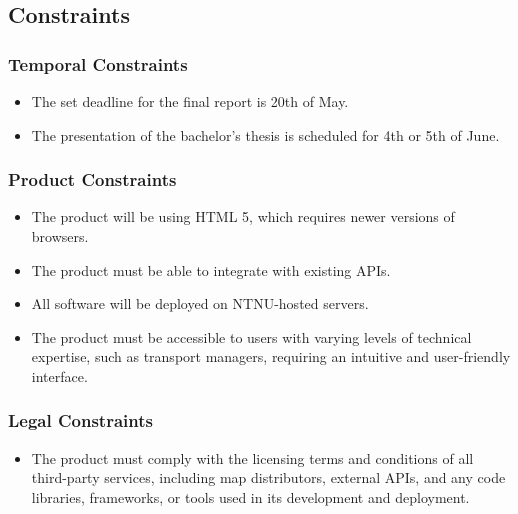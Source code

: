 \subsection{Constraints}

\subsubsection{Temporal Constraints}

\begin{itemize}
    \item The set deadline for the final report is 20th of May.
    \item The presentation of the bachelor's thesis is scheduled for 4th or 5th of June.
\end{itemize}

\subsubsection{Product Constraints}

\begin{itemize}
    \item The product will be using HTML 5, which requires newer versions of browsers.
    \item The product must be able to integrate with existing APIs.
    \item All software will be deployed on NTNU-hosted servers.
    \item The product must be accessible to users with varying levels of technical expertise, such as transport managers, requiring an intuitive and user-friendly interface.
\end{itemize}

\subsubsection{Legal Constraints}

\begin{itemize}
    \item The product must comply with the licensing terms and conditions of all third-party services, including map distributors, external APIs, and any code libraries, frameworks, or tools used in its development and deployment.
\end{itemize}

\newpage
